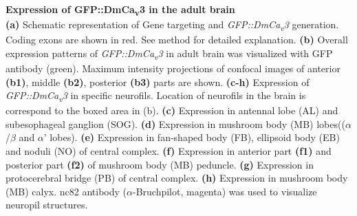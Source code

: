 \label{fig:2} 
\textbf{Expression of GFP::DmCa\textsubscript{v}3 in the adult brain} 
\\ 
\textbf{(a)} Schematic representation of Gene targeting and \emph{GFP::DmCa\textsubscript{v}3} generation. 
Coding exons are shown in red. 
See method for detailed explanation.
\textbf{(b)} Overall expression patterns of \emph{GFP::DmCa\textsubscript{v}3} in adult brain was visualized with GFP antibody (green). 
Maximum intensity projections of confocal images of anterior \textbf{(b1)}, middle \textbf{(b2)}, posterior \textbf{(b3)} parts are shown.
\textbf{(c-h)} Expression of \emph{GFP::DmCa\textsubscript{v}3} in specific neurofils. Location of neurofils in the brain is correspond to the boxed area in (b).
\textbf{(c)} Expression in antennal lobe (AL) and subesophageal ganglion (SOG).
\textbf{(d)} Expression in mushroom body (MB) lobes(($\alpha$/$\beta$ and $\alpha$\textquoteright{} lobes). 
\textbf{(e)} Expression in fan-shaped body (FB), ellipsoid body (EB) and noduli (NO) of central complex.
\textbf{(f)} Expression in anterior part \textbf{(f1)} and posterior part \textbf{(f2)} of mushroom body (MB) peduncle.
\textbf{(g)} Expression in protocerebral bridge (PB) of central complex. 
\textbf{(h)} Expression in mushroom body (MB) calyx. 
nc82  antibody ($\alpha$-Bruchpilot, magenta) was used to visualize neuropil structures. 

  
  
  
  
  
  
  
  